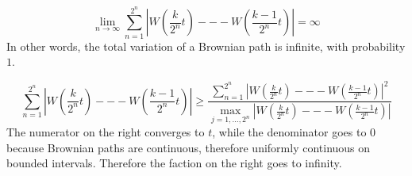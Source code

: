 \begin{solution}
\begin{solution}
\begin{solution}
\begin{solution}
\begin{solution}
\begin{solution}
\begin{solution}
\begin{solution}
\begin{solution}
\begin{solution}
{\begin{problem}
  \begin{theorem}
  $$
   \lim_{n \to \infty}
            \sum_{n=1}^{2^n} 
              \left|
                 W\left( \frac{k}{2^n} t \right) --- 
                 W\left( \frac{k-1}{2^n} t \right)
              \right|
          = \infty
  $$
  In other words, the total variation of a Brownian path is infinite,
  with probability $1$.  
  \end{theorem}

\end{problem} 
\begin{solution} 
$$
    \sum_{n=1}^{2^n} 
      \left| 
         W\left(  \frac{k}{2^n} t \right) --- 
         W\left( \frac{k-1}{2^n} t \right)
      \right|
   \ge
   \frac{ 
                 \sum_{n=1}^{2^n} 
      \left| 
         W\left(  \frac{k}{2^n} t \right) --- 
         W\left( \frac{k-1}{2^n} t \right)
      \right|^2
       }{
\max_{j=1, \ldots, 2^n} \left| 
         W\left(  \frac{k}{2^n} t \right) --- 
         W\left( \frac{k-1}{2^n} t \right)
      \right|
     }
$$
The numerator on the right converges to $t$, while the denominator
goes to $0$ because Brownian paths are continuous, therefore
uniformly continuous on bounded intervals.  Therefore the faction
on the right goes to infinity.
\end{solution}

}
\end{solution}
\end{solution}
\end{solution}
\end{solution}
\end{solution}
\end{solution}
\end{solution}
\end{solution}
\end{solution}
\end{solution}
